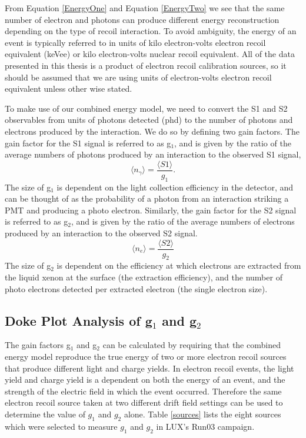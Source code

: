 \documentclass[a4paper,12pt]{article}
\begin{document}
{From Equation \ref{EnergyOne} and Equation \ref{EnergyTwo} we see that the same number of electron and photons can produce different energy reconstruction depending on the type of recoil interaction.  To avoid ambiguity, the energy of an event is typically referred to in units of kilo electron-volts electron recoil equivalent (keVee) or kilo electron-volts nuclear recoil equivalent.  All of the data presented in this thesis is a product of electron recoil calibration sources, so it should be assumed that we are using units of electron-volts electron recoil equivalent unless other wise stated.
 

To make use of our combined energy model, we need to convert the S1 and S2 observables from units of photons detected (phd) to the number of photons and electrons produced by the interaction.  We do so by defining two gain factors.  The gain factor for the S1 signal is referred to as g$_1$, and is given by the ratio of the average numbers of photons produced by an interaction to the observed S1 signal,
\begin{equation}
\langle n_\gamma \rangle = \frac{ \langle S1 \rangle }{g_1}.
\end{equation}
The size of g$_1$ is dependent on the light collection efficiency in the detector, and can be thought of as the probability of a photon from an interaction striking a PMT and producing a photo electron.  Similarly, the gain factor for the S2 signal is referred to as g$_2$, and is given by the ratio of the average numbers of electrons produced by an interaction to the observed S2 signal.  
\begin{equation}
\langle n_e \rangle = \frac{ \langle S2 \rangle }{g_2}
\end{equation}
The size of g$_2$ is dependent on the efficiency at which electrons are extracted from the liquid xenon at the surface (the extraction efficiency), and the number of photo electrons detected per extracted electron (the single electron size).


\subsection{Doke Plot Analysis of g$_1$ and g$_2$}


The gain factors g$_1$ and g$_2$ can be calculated by requiring that the combined energy model reproduce the true energy of two or more electron recoil sources that produce different light and charge yields.  In electron recoil events, the light yield and charge yield is a dependent on both the energy of an event, and the strength of the electric field in which the event occurred.  Therefore the same electron recoil source taken at two different drift field settings can be used to determine the value of $g_1$ and $g_2$ alone. Table \ref{sources} lists the eight sources which were selected to measure $g_1$ and $g_2$ in LUX's Run03 campaign.  


}
\end{document}
